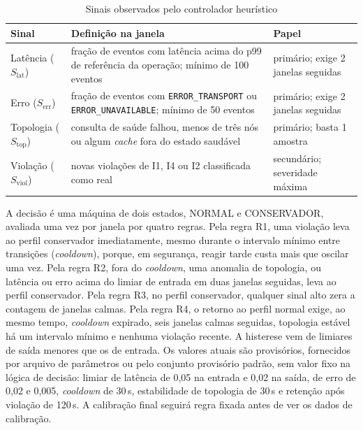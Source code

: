 \begin{table}[htbp]
\captionsetup{type=table, name=Quadro}
\caption{Sinais observados pelo controlador heurístico}
\label{qd-sinais-controlador}
\centering
\footnotesize
\begin{tabular}{p{2.6cm}p{6.4cm}p{4.2cm}}
\hline
\textbf{Sinal} & \textbf{Definição na janela} & \textbf{Papel} \\
\hline
Latência ($S_\text{lat}$) & fração de eventos com latência acima do p99 de referência da operação; mínimo de 100 eventos & primário; exige 2 janelas seguidas \\
Erro ($S_\text{err}$) & fração de eventos com \texttt{ERROR\_TRANSPORT} ou \texttt{ERROR\_UNAVAILABLE}; mínimo de 50 eventos & primário; exige 2 janelas seguidas \\
Topologia ($S_\text{top}$) & consulta de saúde falhou, menos de três nós ou algum \emph{cache} fora do estado saudável & primário; basta 1 amostra \\
Violação ($S_\text{viol}$) & novas violações de I1, I4 ou I2 classificada como real & secundário; severidade máxima \\
\hline
\end{tabular}
\end{table}

A decisão é uma máquina de dois estados, NORMAL e CONSERVADOR, avaliada uma vez por janela por quatro regras. Pela regra R1, uma violação leva ao perfil conservador imediatamente, mesmo durante o intervalo mínimo entre transições (\emph{cooldown}), porque, em segurança, reagir tarde custa mais que oscilar uma vez. Pela regra R2, fora do \emph{cooldown}, uma anomalia de topologia, ou latência ou erro acima do limiar de entrada em duas janelas seguidas, leva ao perfil conservador. Pela regra R3, no perfil conservador, qualquer sinal alto zera a contagem de janelas calmas. Pela regra R4, o retorno ao perfil normal exige, ao mesmo tempo, \emph{cooldown} expirado, seis janelas calmas seguidas, topologia estável há um intervalo mínimo e nenhuma violação recente. A histerese vem de limiares de saída menores que os de entrada. Os valores atuais são provisórios, fornecidos por arquivo de parâmetros ou pelo conjunto provisório padrão, sem valor fixo na lógica de decisão: limiar de latência de 0,05 na entrada e 0,02 na saída, de erro de 0,02 e 0,005, \emph{cooldown} de 30\,s, estabilidade de topologia de 30\,s e retenção após violação de 120\,s. A calibração final seguirá regra fixada antes de ver os dados de calibração.

